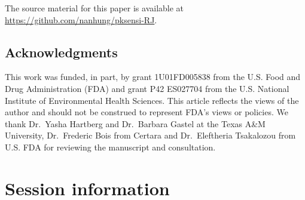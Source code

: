 The source material for this paper is available at
\url{https://github.com/nanhung/pksensi-RJ}.

\hypertarget{acknowledgments}{%
\subsection{Acknowledgments}\label{acknowledgments}}

This work was funded, in part, by grant 1U01FD005838 from the U.S. Food
and Drug Administration (FDA) and grant P42 ES027704 from the U.S.
National Institute of Environmental Health Sciences. This article
reflects the views of the author and should not be construed to
represent FDA's views or policies. We thank Dr.~Yasha Hartberg and
Dr.~Barbara Gastel at the Texas A\&M University, Dr.~Frederic Bois from
Certara and Dr.~Eleftheria Tsakalozou from U.S. FDA for reviewing the
manuscript and consultation.

\hypertarget{session-information}{%
\section{Session information}\label{session-information}}

